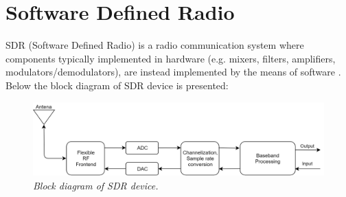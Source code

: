 \documentclass[en,printmode]{mgr}
\begin{document}
	\newpage
	\section{Software Defined Radio}
		SDR (Software Defined Radio) is a radio communication system where components typically
		 implemented in hardware 
		(e.g. mixers, filters, amplifiers, modulators/demodulators), are instead implemented
		 by the means of software \cite{sdr}.
		\\
		
		
		Below the block diagram of SDR device is presented:
		\begin{figure}[!htb]
    		\centering
   			\includegraphics[width=\textwidth]{diag/sdr.png}
    		\caption{\textit{Block diagram of SDR device.}}
		\end{figure}
		
\end{document}
